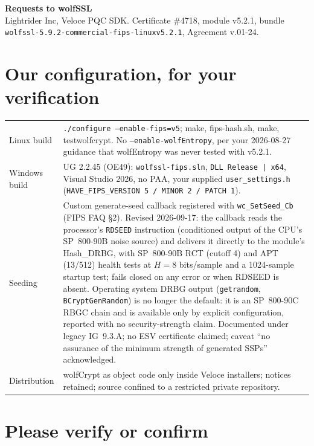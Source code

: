 \documentclass[10pt]{article}
\newcommand{\code}[1]{\texttt{\small #1}}
\begin{document}
{\LARGE\sffamily\bfseries Requests to wolfSSL}\\[0.2em]
{\sffamily Lightrider Inc, Veloce PQC SDK. Certificate \#4718, module
v5.2.1, bundle \code{wolfssl-5.9.2-commercial-fips-linuxv5.2.1},
Agreement v.01-24.}

\section{Our configuration, for your verification}

\begin{small}
\begin{tabularx}{\textwidth}{@{}lL@{}}
\toprule
Linux build & \code{./configure --enable-fips=v5}; make, fips-hash.sh,
  make, testwolfcrypt. No \code{--enable-wolfEntropy}, per your 2026-08-27
  guidance that wolfEntropy was never tested with v5.2.1. \\
Windows build & UG 2.2.45 (OE49): \code{wolfssl-fips.sln},
  \code{DLL Release | x64}, Visual Studio 2026, no PAA, your supplied
  \code{user\_settings.h} (\code{HAVE\_FIPS\_VERSION 5 / MINOR 2 / PATCH 1}). \\
Seeding & Custom generate-seed callback registered with
  \code{wc\_SetSeed\_Cb} (FIPS FAQ \S2). Revised 2026-09-17: the callback
  reads the processor's \code{RDSEED} instruction (conditioned output of the
  CPU's SP~800-90B noise source) and delivers it directly to the module's
  Hash\_DRBG, with SP~800-90B RCT (cutoff 4) and APT (13/512) health tests at
  $H = 8$ bits/sample and a 1024-sample startup test; fails closed on any
  error or when RDSEED is absent. Operating system DRBG output
  (\code{getrandom}, \code{BCryptGenRandom}) is no longer the default: it is
  an SP~800-90C RBGC chain and is available only by explicit configuration,
  reported with no security-strength claim. Documented under legacy
  IG~9.3.A; no ESV certificate claimed; caveat ``no assurance of the minimum
  strength of generated SSPs'' acknowledged. \\
Distribution & wolfCrypt as object code only inside Veloce installers;
  notices retained; source confined to a restricted private repository. \\
\bottomrule
\end{tabularx}
\end{small}

\section{Please verify or confirm}
\end{document}
